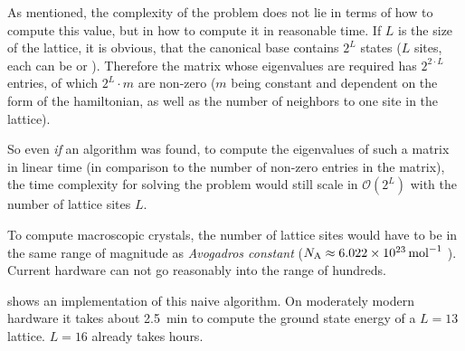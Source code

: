 As mentioned, the complexity of the problem does not lie in terms of how to compute this value, but in how to compute it in reasonable time.
If $L$ is the size of the lattice, it is obvious, that the canonical base contains $2^L$ states ($L$ sites, each can be \up or \down).
Therefore the matrix whose eigenvalues are required has $2^{2\cdot L}$ entries, of which $2^L \cdot m$ are non-zero ($m$ being constant and dependent on the form of the hamiltonian, as well as the number of neighbors to one site in the lattice). 

So even \emph{if} an algorithm was found, to compute the eigenvalues of such a matrix in linear time (in comparison to the number of non-zero entries in the matrix), the time complexity for solving the problem would still scale in $\mathcal{O} (2^L)$ with the number of lattice sites $L$.

To compute macroscopic crystals, the number of lattice sites would have to be in the same range of magnitude as \emph{Avogadros constant} ($N_\mathrm{A} \approx \SI{6.022E23}{\per\mol}$ \cite{avogadrosNumber}). Current hardware can not go reasonably into the range of hundreds. 

 shows an implementation of this naive algorithm. On moderately modern hardware it takes about \SI{2.5}{\minute} to compute the ground state energy of a $L=13$ lattice. $L=16$ already takes hours.